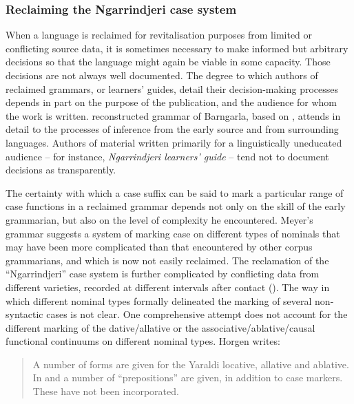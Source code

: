 \subsubsection{Reclaiming the Ngarrindjeri case system}
\label{sec:key:6.1.2.2}

When a language is reclaimed for revitalisation purposes from limited or conflicting source data, it is sometimes necessary to make informed but arbitrary decisions so that the language might again be viable in some capacity. Those decisions are not always well documented. The degree to which authors of reclaimed grammars, or learners' guides, detail their decision-making processes depends in part on the purpose of the publication, and the audience for whom the work is written. \citet{Clendon2015} reconstructed grammar of Barngarla, based on \citet{schurmann_vocabulary_1844}, attends in detail to the processes of inference from the early source and from surrounding languages. Authors of material written primarily for a linguistically uneducated audience – for instance,  \textit{Ngarrindjeri learners' guide} – tend not to document decisions as transparently.

The certainty with which a case suffix can be said to mark a particular range of case functions in a reclaimed grammar depends not only on the skill of the early grammarian, but also on the level of complexity he encountered. Meyer’s grammar suggests a system of marking case on different types of nominals that may have been more complicated than that encountered by other corpus grammarians, and which is now not easily reclaimed. The reclamation of the “Ngarrindjeri” case system is further complicated by conflicting data from different varieties, recorded at different intervals after contact (). The way in which different nominal types formally delineated the marking of several non-syntactic cases is not clear. One comprehensive attempt \citep[95]{Horgen2004} does not account for the different marking of the dative/allative or the associative/ablative/causal functional continuums on different nominal types. Horgen writes:

\begin{quote}
	A number of forms are given for the Yaraldi locative, allative and ablative. In \citet[12--18]{meyer_vocabulary_1843} and \citet[8]{Taplin1880} a number of “prepositions” are given, in addition to case markers. These have not been incorporated. \citep[95]{horgen_languages_2004}
\end{quote}

